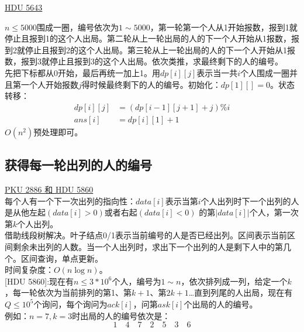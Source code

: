 \underline {HDU 5643}

$n\leq 5000$围成一圈，编号依次为$1\sim 5000$，第一轮第一个人从1开始报数，报到1就停止且报到1的这个人出局。第二轮从上一轮出局的人的下一个人开始从1报数，报到2就停止且报到2的这个人出局。第三轮从上一轮出局的人的下一个人开始从1报数，报到3就停止且报到3的这个人出局。依次类推，求最终剩下的人的编号。\\

先把下标都从0开始，最后再统一加上1。用$dp[i][j]$表示当一共$i$个人围成一圈并且第一个人开始报数$j$得时候最终剩下的人的编号。初始化：$dp[1][]=0$。状态转移：
\[
\begin{aligned}
dp[i][j] &=(dp[i-1][j+1]+j)\% i \\
ans[i] &=dp[i][1]+1
\end{aligned}
\]
$O(n^2)$预处理即可。

\subsection{获得每一轮出列的人的编号}

\underline {PKU 2886 和 HDU 5860}\\

每个人有一个下一次出列的指向性：$data[i]$表示当第$i$个人出列时下一个出列的人是从他左起$(data[i] > 0)$或者右起$(data[i]<0)$ 的第$|data[i]|$个人，第一次第$k$个人出列。 \\

借助线段树解决。叶子结点0/1表示当前编号的人是否已经出列。区间表示当前区间剩余未出列的人数。当一个人出列时，求出下一个出列的人是剩下人中的第几个。区间查询，单点更新。\\
时间复杂度：$O(n\log n)$。\\

[HDU 5860]:现在有$n\leq 3*10^{6}$个人，编号为$1\sim n$，依次排列成一列，给定一个$k$，每一轮依次为当前排列的第1、第$k+1$、第$2k+1$…直到列尾的人出局，现在有$Q\leq 10^5$个询问，每个询问为$ack[i]$，问第$ask[i]$个出局的人的编号。\\
例如：$n=7,k=3$时出局的人的编号依次是：
$$1\quad 4\quad 7\quad 2\quad 5\quad 3\quad 6$$

